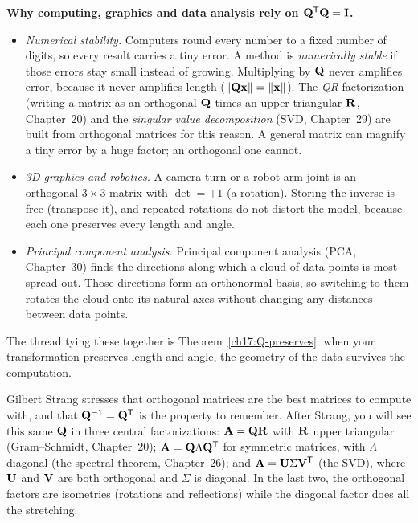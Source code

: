 \begin{applicationbox}
\textbf{Why computing, graphics and data analysis rely on $\mathbf{Q}^{\mathsf{T}}\mathbf{Q}=\mathbf{I}$.}
\begin{itemize}
  \item \emph{Numerical stability.} Computers round every number to a fixed number of digits, so
        every result carries a tiny error. A method is \emph{numerically stable} if those errors
        stay small instead of growing. Multiplying by $\mathbf{Q}$ never amplifies error, because it
        never amplifies length ($\lVert\mathbf{Q}\mathbf{x}\rVert=\lVert\mathbf{x}\rVert$). The \emph{QR}
        factorization (writing a matrix as an orthogonal $\mathbf{Q}$ times an upper-triangular
        $\mathbf{R}$, Chapter~20) and the \emph{singular value decomposition} (SVD, Chapter~29) are
        built from orthogonal matrices for this reason. A general matrix can magnify a tiny error
        by a huge factor; an orthogonal one cannot.
  \item \emph{3D graphics and robotics.} A camera turn or a robot-arm joint is an orthogonal
        $3\times3$ matrix with $\det=+1$ (a rotation). Storing the inverse is free (transpose
        it), and repeated rotations do not distort the model, because each one preserves
        every length and angle.
  \item \emph{Principal component analysis.} Principal component analysis (PCA, Chapter~30)
        finds the directions along which a cloud of data points is most spread out. Those
        directions form an orthonormal basis, so switching to them rotates the cloud onto its
        natural axes without changing any distances between data points.
\end{itemize}
The thread tying these together is Theorem~\ref{ch17:Q-preserves}: when your transformation
preserves length and angle, the geometry of the data survives the computation.
\end{applicationbox}

\begin{strangbox}
Gilbert Strang stresses that orthogonal matrices are the best matrices to compute with, and
that $\mathbf{Q}^{-1}=\mathbf{Q}^{\mathsf{T}}$ is the property to remember. After Strang, you will see this same
$\mathbf{Q}$ in three central factorizations: $\mathbf{A}=\mathbf{Q}\mathbf{R}$ with $\mathbf{R}$ upper triangular
(Gram--Schmidt, Chapter~20); $\mathbf{A}=\mathbf{Q}\Lambda\mathbf{Q}^{\mathsf{T}}$ for symmetric matrices, with
$\Lambda$ diagonal (the spectral theorem, Chapter~26); and $\mathbf{A}=\mathbf{U}\Sigma\mathbf{V}^{\mathsf{T}}$ (the SVD),
where $\mathbf{U}$ and $\mathbf{V}$ are both orthogonal and $\Sigma$ is diagonal. In the last two, the
orthogonal factors are isometries (rotations and reflections) while the diagonal factor does all
the stretching.
\end{strangbox}

